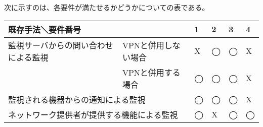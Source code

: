 	次に示すのは、各要件が満たせるかどうかについての表である。
	\begin{table}[htbp]
	\begin{tabular}{|l|l|l|l|l|l|} \hline
		\multicolumn{2}{|l|}{既存手法＼要件番号} & 
		\multicolumn{1}{|l|}{1} &
		\multicolumn{1}{|l|}{2} &
		\multicolumn{1}{|l|}{3} &
		\multicolumn{1}{|l|}{4} \\ \hline \hline
		監視サーバからの問い合わせによる監視 & VPNと併用しない場合 & X & ◯ & ◯ & X  \\ \cline{2-6}
			& VPNと併用する場合 & ◯ & ◯ & ◯ & X \\ \hline
		\multicolumn{2}{|l|}{監視される機器からの通知による監視} & ◯ & ◯ & ◯ & X \\ \hline
		\multicolumn{2}{|l|}{ネットワーク提供者が提供する機能による監視} & ◯ & X & ◯ & ◯ \\ \hline
	\end{tabular}
	\end{table}
\begin{comment}
	しかし、サーバーからの問い合わせによる監視では、IoT機器が接続するネットワークがプライベートアドレスであった場合に利用できず、
	監視対象機器からの通知による監視では、新たに機器監視サーバをたち上げなくてはならない。
	また、ネットワークの提供者による機器の監視サービスでは、提供ネットワークを利用した機器のリンクアップ・ダウンしか監視することが出来ず、
	VPNを利用した方法では、IoT機器が接続するネットワークのアドレス帯が多様であることから、難しい。
\end{comment}
	
	







